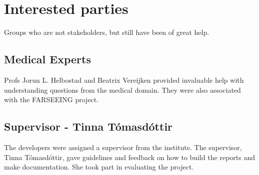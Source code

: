 \section{Interested parties}
Groups who are not stakeholders, but still have been of great help.
\subsection{Medical Experts}
Profs Jorun L. Helbostad and Beatrix Vereijken provided invaluable help with understanding questions from the medical domain. They were also associated with the FARSEEING project.
 \subsection{Supervisor - Tinna T\'{o}masd\'{o}ttir}
The developers were assigned a supervisor from the institute. The supervisor, Tinna T\'{o}masd\'{o}ttir, gave guidelines and feedback on how to build the reports and make documentation. She took part in evaluating the project.

